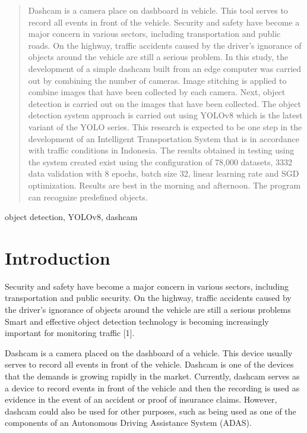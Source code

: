 \documentclass[conference]{IEEEtran}
\begin{document}
\begin{abstract}
Dashcam is a camera place on dashboard  in vehicle. This tool serves to record all events in front of the vehicle. 
Security and safety have become a major concern in various sectors, including transportation and public roads. 
On the highway, traffic accidents caused by the driver's ignorance of objects around the vehicle are still a serious problem. 
In this study, the development of a simple dashcam built from an edge computer was carried out by combining the number of cameras. Image stitching is applied to combine images that have been collected by each camera.  
Next, object detection is carried out on the images that have been collected. The object detection system approach is carried out using YOLOv8 which is the latest variant of the YOLO series. This research is expected to be one step in the development of an Intelligent Transportation System that is in accordance with traffic conditions in Indonesia.
The results obtained in testing using the system created exist using the configuration of 78,000 datasets, 3332 data validation with 8 epochs, batch size 32, linear learning rate and SGD optimization. Results are best in the morning and afternoon. The program can recognize predefined objects. 
\end{abstract}

\begin{IEEEkeywords}
object detection, YOLOv8, dashcam
\end{IEEEkeywords}

\section{Introduction}
Security and safety have become a major concern in various sectors, including transportation and public security. On the highway, traffic accidents caused by the driver's ignorance of objects around the vehicle are still a serious problems
Smart and effective object detection technology is becoming increasingly important for monitoring traffic [1].

Dashcam is a camera placed on the dashboard of a vehicle. This device usually serves to record all events in front of the vehicle.
Dashcam is one of the devices that the demands is growing rapidly in the market. Currently, dashcam serves as a device to record events in front of the vehicle and then the recording is used as evidence in the event of an accident or proof of insurance claims. 
However, dashcam could also be used for other purposes, such as being used as one of the components of an Autonomous Driving Assistance System (ADAS). 
\end{document}
